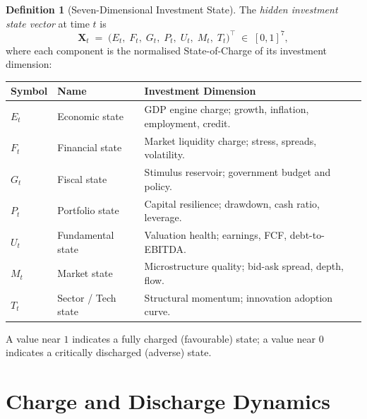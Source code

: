 \documentclass[12pt,openany]{book}
\newcommand{\calE}{\mathcal{E}}
\newcommand{\calF}{\mathcal{F}}
\newcommand{\calG}{\mathcal{G}}
\newcommand{\calP}{\mathcal{P}}
\newcommand{\calU}{\mathcal{U}}
\newcommand{\calM}{\mathcal{M}}
\newcommand{\calT}{\mathcal{T}}
\numberwithin{equation}{chapter}
\theoremstyle{plain}
\theoremstyle{definition}
\newtheorem{definition}[theorem]{Definition}
\theoremstyle{remark}
\def\mathcal#1{#1}%
\begin{document}
\begin{definition}[Seven-Dimensional Investment State]
\label{def:hidden-state}
The \emph{hidden investment state vector} at time $t$ is
\begin{equation}
  \mathbf{X}_t \;=\;
  \bigl(\calE_t,\; \calF_t,\; \calG_t,\; \calP_t,\;
        \calU_t,\; \calM_t,\; \calT_t\bigr)^\top
  \;\in\; [0,1]^7,
  \label{eq:hidden-state}
\end{equation}
where each component is the normalised State-of-Charge of its
investment dimension:

\begin{center}
\begin{tabularx}{\textwidth}{@{} l l X @{}}
\toprule
\textbf{Symbol} & \textbf{Name}
  & \textbf{Investment Dimension} \\
\midrule
$\calE_t$ & Economic state
  & GDP engine charge; growth, inflation, employment, credit. \\
$\calF_t$ & Financial state
  & Market liquidity charge; stress, spreads, volatility. \\
$\calG_t$ & Fiscal state
  & Stimulus reservoir; government budget and policy. \\
$\calP_t$ & Portfolio state
  & Capital resilience; drawdown, cash ratio, leverage. \\
$\calU_t$ & Fundamental state
  & Valuation health; earnings, FCF, debt-to-EBITDA. \\
$\calM_t$ & Market state
  & Microstructure quality; bid-ask spread, depth, flow. \\
$\calT_t$ & Sector / Tech state
  & Structural momentum; innovation adoption curve. \\
\bottomrule
\end{tabularx}
\end{center}

A value near $1$ indicates a fully charged (favourable) state;
a value near $0$ indicates a critically discharged (adverse) state.
\end{definition}

\section{Charge and Discharge Dynamics}
\end{document}
